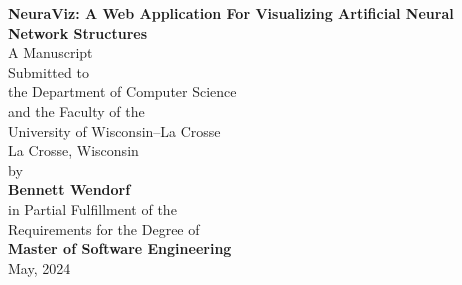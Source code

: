 \begin{titlepage}
	\begin{center}
		\vspace*{0.5in}
		\begin{doublespace}
			\LARGE \textbf{NeuraViz: A Web Application For Visualizing Artificial Neural Network Structures} \\
			\vspace*{1in}
			\normalsize
			A Manuscript \\
			Submitted to \\
			the Department of Computer Science \\
			and the Faculty of the\\
			University of Wisconsin--La Crosse \\
			La Crosse, Wisconsin \\
			\vspace*{0.5in}
			by \\
			\large
			\textbf{Bennett Wendorf} \\

			\vspace*{0.5in}
			\normalsize
			in Partial Fulfillment of the \\
			Requirements for the Degree of\\
			\Large{\textbf{Master of Software Engineering}} \\
			\normalsize
			May, 2024
		\end{doublespace}
	\end{center}
\end{titlepage}
